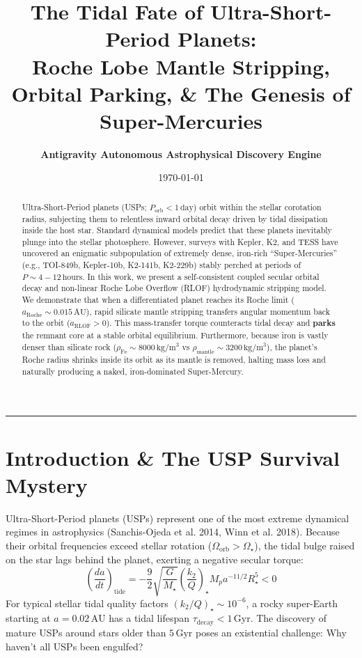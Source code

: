 \documentclass[11pt,a4paper]{article}
\title{\Huge \textbf{The Tidal Fate of Ultra-Short-Period Planets:}\\ \Large Roche Lobe Mantle Stripping, Orbital Parking, \& The Genesis of Super-Mercuries}
\author{\textbf{Antigravity Autonomous Astrophysical Discovery Engine}}
\date{\today}
\begin{document}
\maketitle

\begin{abstract}
Ultra-Short-Period planets (USPs; $P_{\text{orb}} < 1\,\mathrm{day}$) orbit within the stellar corotation radius, subjecting them to relentless inward orbital decay driven by tidal dissipation inside the host star. Standard dynamical models predict that these planets inevitably plunge into the stellar photosphere. However, surveys with Kepler, K2, and TESS have uncovered an enigmatic subpopulation of extremely dense, iron-rich ``Super-Mercuries'' (e.g., TOI-849b, Kepler-10b, K2-141b, K2-229b) stably perched at periods of $P \sim 4 - 12\,\mathrm{hours}$. In this work, we present a self-consistent coupled secular orbital decay and non-linear Roche Lobe Overflow (RLOF) hydrodynamic stripping model. We demonstrate that when a differentiated planet reaches its Roche limit ($a_{\text{Roche}} \sim 0.015\,\mathrm{AU}$), rapid silicate mantle stripping transfers angular momentum back to the orbit ($\dot{a}_{\text{RLOF}} > 0$). This mass-transfer torque counteracts tidal decay and \textbf{parks} the remnant core at a stable orbital equilibrium. Furthermore, because iron is vastly denser than silicate rock ($\rho_{\text{Fe}} \sim 8000\,\mathrm{kg/m^3}$ vs $\rho_{\text{mantle}} \sim 3200\,\mathrm{kg/m^3}$), the planet's Roche radius shrinks inside its orbit as its mantle is removed, halting mass loss and naturally producing a naked, iron-dominated Super-Mercury.
\end{abstract}

\vspace{1em}
\begin{center}
\rule{\textwidth}{1.5pt}
\end{center}

\section{Introduction \& The USP Survival Mystery}
Ultra-Short-Period planets (USPs) represent one of the most extreme dynamical regimes in astrophysics (Sanchis-Ojeda et al. 2014, Winn et al. 2018). Because their orbital frequencies exceed stellar rotation ($\Omega_{\text{orb}} > \Omega_\star$), the tidal bulge raised on the star lags behind the planet, exerting a negative secular torque:
\begin{equation}
\left( \frac{da}{dt} \right)_{\text{tide}} = -\frac{9}{2} \sqrt{\frac{G}{M_\star}} \left(\frac{k_2}{Q}\right)_\star M_p a^{-11/2} R_\star^5 < 0
\end{equation}
For typical stellar tidal quality factors $(k_2 / Q)_\star \sim 10^{-6}$, a rocky super-Earth starting at $a = 0.02\,\mathrm{AU}$ has a tidal lifespan $\tau_{\text{decay}} < 1\,\mathrm{Gyr}$. The discovery of mature USPs around stars older than $5\,\mathrm{Gyr}$ poses an existential challenge: Why haven't all USPs been engulfed?
\end{document}
